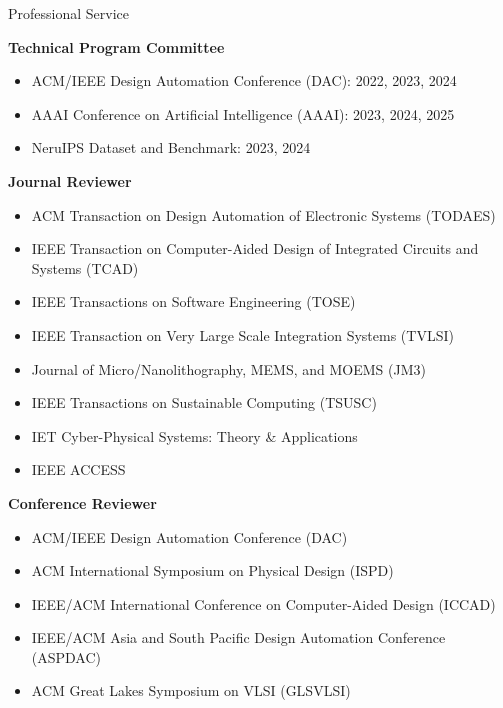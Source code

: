 \iftrue
\begin{rSection}{Professional Service}
	
\textbf{Technical Program Committee}
\begin{itemize}
	\item ACM/IEEE Design Automation Conference (DAC): 2022, 2023, 2024
	\item AAAI Conference on Artificial Intelligence (AAAI): 2023, 2024, 2025
	\item NeruIPS Dataset and Benchmark: 2023, 2024
\end{itemize}

\textbf{Journal Reviewer}
\begin{itemize}
    \item ACM Transaction on Design Automation of Electronic Systems (TODAES)
    \item IEEE Transaction on Computer-Aided Design of Integrated Circuits and Systems (TCAD)
    \item IEEE Transactions on Software Engineering (TOSE)
    \item IEEE Transaction on Very Large Scale Integration Systems (TVLSI)
    \item Journal of Micro/Nanolithography, MEMS, and MOEMS (JM3)
    \item IEEE Transactions on Sustainable Computing (TSUSC)
    \item IET Cyber-Physical Systems: Theory \& Applications
    \item IEEE ACCESS
\end{itemize}

\textbf{Conference Reviewer}
\begin{itemize}
    \item ACM/IEEE Design Automation Conference (DAC)
    \item ACM International Symposium on Physical Design (ISPD)
    \item IEEE/ACM International Conference on Computer-Aided Design (ICCAD)
    \item IEEE/ACM Asia and South Pacific Design Automation Conference (ASPDAC)
	\item ACM Great Lakes Symposium on VLSI (GLSVLSI)
\end{itemize}
\end{rSection}
\fi

